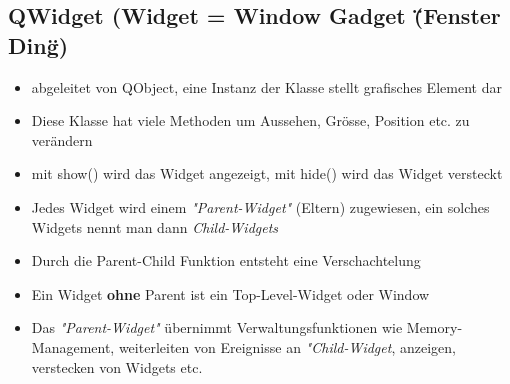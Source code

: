 \subsection{QWidget (Widget = Window Gadget (\"{}Fenster Ding\"{})}
\begin{itemize}
	\item abgeleitet von QObject,  eine Instanz der Klasse stellt grafisches Element dar
	\item Diese Klasse hat viele Methoden um Aussehen, Grösse, Position etc. zu verändern
	\item mit show() wird das Widget angezeigt, mit hide() wird das Widget versteckt
	\item Jedes Widget wird einem \textit{"Parent-Widget"} (Eltern) zugewiesen, ein solches Widgets nennt man dann \textit{Child-Widgets}
	\item Durch die Parent-Child Funktion entsteht eine Verschachtelung
	\item Ein Widget \textbf{ohne} Parent ist ein Top-Level-Widget oder Window	
	\item Das \textit{"Parent-Widget"} übernimmt Verwaltungsfunktionen wie Memory-Management, \newline
    weiterleiten von Ereignisse an \textit{"Child-Widget}, anzeigen, verstecken von Widgets etc.
\end{itemize}

